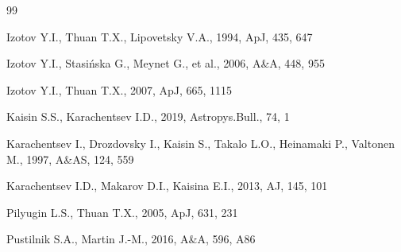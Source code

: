 \documentclass[useAMS,usenatbib]{mn2e}
\newcommand{\apj}{ApJ}
\begin{document}
\begin{thebibliography}{99}

Izotov Y.I., Thuan T.X., Lipovetsky V.A., 1994,  \apj,  435, 647


Izotov Y.I., Stasi\'{n}ska G., Meynet G., et al.,
2006, A\&A, 448, 955

Izotov Y.I., Thuan T.X., 2007,  \apj,  665, 1115




   Kaisin S.S., Karachentsev I.D., 2019, Astropys.Bull., 74, 1


     Karachentsev I., Drozdovsky I., Kaisin S., Takalo L.O., Heinamaki P., Valtonen M.,
     1997, A\&AS, 124, 559

     Karachentsev I.D., Makarov D.I., Kaisina E.I., 2013, AJ, 145, 101

Pilyugin L.S., Thuan T.X., 2005, ApJ, 631, 231


      Pustilnik S.A., Martin J.-M., 2016, A\&A, 596, A86


\end{thebibliography}
\end{document}
